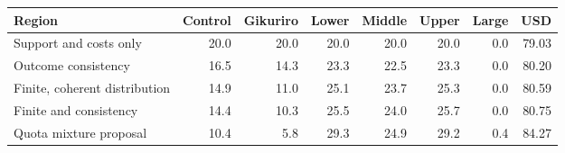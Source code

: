 \begin{tabular}{lrrrrrrr}
\toprule
Region & Control & Gikuriro & Lower & Middle & Upper & Large & USD \\
\midrule
Support and costs only & 20.0 & 20.0 & 20.0 & 20.0 & 20.0 & 0.0 & 79.03 \\
Outcome consistency & 16.5 & 14.3 & 23.3 & 22.5 & 23.3 & 0.0 & 80.20 \\
Finite, coherent distribution & 14.9 & 11.0 & 25.1 & 23.7 & 25.3 & 0.0 & 80.59 \\
Finite and consistency & 14.4 & 10.3 & 25.5 & 24.0 & 25.7 & 0.0 & 80.75 \\
Quota mixture proposal & 10.4 & 5.8 & 29.3 & 24.9 & 29.2 & 0.4 & 84.27 \\
\bottomrule
\end{tabular}

